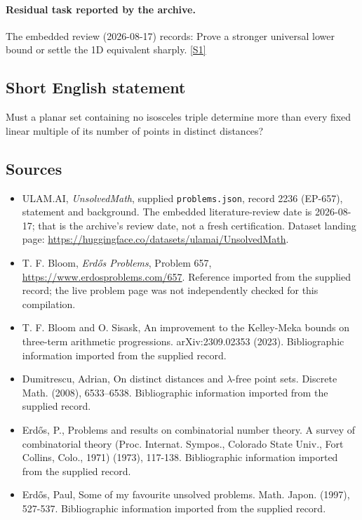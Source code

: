 \documentclass[11pt,a4paper]{article}
\newcommand{\sref}[2]{\hyperlink{source:#1:#2}{[S#2]}}
\begin{document}
\paragraph{Residual task reported by the archive.}

The embedded review (2026-08-17) records: Prove a stronger universal lower bound or settle the 1D equivalent sharply. \sref{2236}{1}

\subsection{Short English statement}

Must a planar set containing no isosceles triple determine more than every fixed linear multiple of its number of points in distinct distances?

\subsection{Sources}

{\small

\begin{itemize}

\item[\hypertarget{source:2236:1}{S1}] ULAM.AI, \emph{UnsolvedMath}, supplied \texttt{problems.json}, record 2236 (EP-657), statement and background. The embedded literature-review date is 2026-08-17; that is the archive’s review date, not a fresh certification. Dataset landing page: \url{https://huggingface.co/datasets/ulamai/UnsolvedMath}.

\item[\hypertarget{source:2236:2}{S2}] T. F. Bloom, \emph{Erdős Problems}, Problem 657, \url{https://www.erdosproblems.com/657}. Reference imported from the supplied record; the live problem page was not independently checked for this compilation.

\item[\hypertarget{source:2236:3}{S3}] T. F. Bloom and O. Sisask, An improvement to the Kelley-Meka bounds on three-term arithmetic progressions. arXiv:2309.02353 (2023). Bibliographic information imported from the supplied record.

\item[\hypertarget{source:2236:4}{S4}] Dumitrescu, Adrian, On distinct distances and {$\lambda$}-free point sets. Discrete Math. (2008), 6533--6538. Bibliographic information imported from the supplied record.

\item[\hypertarget{source:2236:5}{S5}] Erd\H{o}s, P., Problems and results on combinatorial number theory. A survey of combinatorial theory (Proc. Internat. Sympos., Colorado State Univ., Fort Collins, Colo., 1971) (1973), 117-138. Bibliographic information imported from the supplied record.

\item[\hypertarget{source:2236:6}{S6}] Erd\H{o}s, Paul, Some of my favourite unsolved problems. Math. Japon. (1997), 527-537. Bibliographic information imported from the supplied record.

\end{itemize}

}

\label{end:2236}
\end{document}
